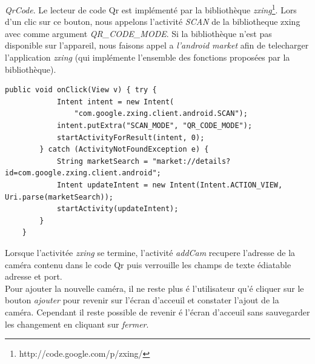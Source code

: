 \textit{QrCode}.
\indent Le lecteur de code Qr est implémenté par la bibliothèque
\textit{zxing}\footnote{\label{zxing} http://code.google.com/p/zxing/}. \newline
Lors d'un clic sur ce bouton, nous appelons l'activité 
\textit{SCAN} de la bibliotheque zxing avec comme argument
\textit{QR\_CODE\_MODE}.\newline
Si la bibliothèque n'est pas disponible sur l'appareil, nous faisons appel a
\textit{l'android market} afin de telecharger l'application \textit{zxing} (qui
implémente l'ensemble des fonctions proposées par la bibliothèque).
\newpage
\begin{lstlisting}[caption={Lancement de l'activité zxing ou de l'android
market.}] 
    public void onClick(View v) { try {
            Intent intent = new Intent(
                "com.google.zxing.client.android.SCAN");
            intent.putExtra("SCAN_MODE", "QR_CODE_MODE");
            startActivityForResult(intent, 0);
        } catch (ActivityNotFoundException e) {
            String marketSearch = "market://details?id=com.google.zxing.client.android";
            Intent updateIntent = new Intent(Intent.ACTION_VIEW, Uri.parse(marketSearch));
            startActivity(updateIntent);
        }
    }
\end{lstlisting}

\indent \newline
\indent Lorsque l'activitée \textit{zxing} se termine, l'activité
\textit{addCam} recupere l'adresse de la caméra contenu dans le code Qr puis verrouille les
champs de texte édiatable adresse et port.\\
\indent Pour ajouter la nouvelle
caméra, il ne reste plus  é l'utilisateur qu'é cliquer sur le bouton
\textit{ajouter} pour revenir sur l'écran d'acceuil et constater l'ajout de la caméra. Cependant il reste possible de revenir é l'écran d'acceuil sans sauvegarder les changement en cliquant sur \textit{fermer}.

